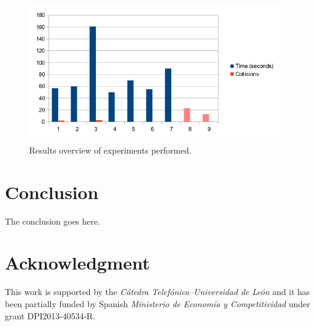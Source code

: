 \documentclass[journal,twoside]{JoPhA}
\begin{document}
\begin{figure}[h]
	\centering
	\includegraphics[scale=0.55]{Figures/ResumenDatos_PruebaBasica.png} 
	\caption{\label{3Dprinter}Results overview of experiments performed.}
\end{figure}



\section{Conclusion}

The conclusion goes here.


\section*{Acknowledgment}

This work is supported by the \textit{C\'{a}tedra Telef\'{o}nica--Universidad de Le\'{o}n} and it has been partially funded by Spanish \textit{Ministerio de Econom\'{i}a y Competitividad} under grant DPI2013-40534-R.
\end{document}
